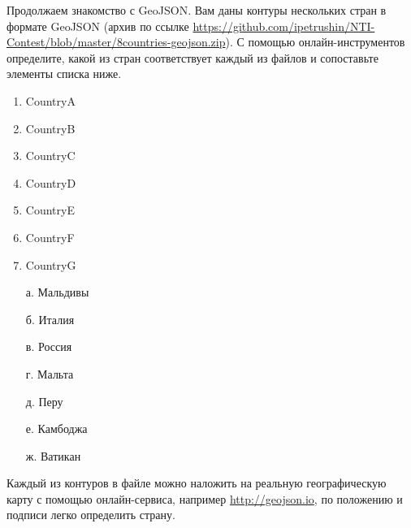 
Продолжаем знакомство с GeoJSON. Вам даны контуры нескольких стран в формате GeoJSON (архив по ссылке \url{https://github.com/ipetrushin/NTI-Contest/blob/master/8countries-geojson.zip}). 
С помощью онлайн-инструментов определите, какой из стран соответствует каждый из файлов и сопоставьте элементы списка ниже.

\begin{multicols}{2}
    {
        \begin{enumerate}
            \item CountryA
            \item CountryB
            \item CountryC
            \item CountryD
            \item CountryE
            \item CountryF
            \item CountryG
        \end{enumerate}
    }

    {
        \begin{enumerate}
            \item[а.] Мальдивы
            \item[б.] Италия
            \item[в.] Россия
            \item[г.] Мальта
            \item[д.] Перу
            \item[е.] Камбоджа
            \item[ж.] Ватикан
        \end{enumerate}
    }  
\end{multicols}

\explanationSection

Каждый из контуров  в файле можно наложить на реальную географическую карту с помощью онлайн-сервиса, например \url{http://geojson.io}, по положению и подписи легко определить страну.

